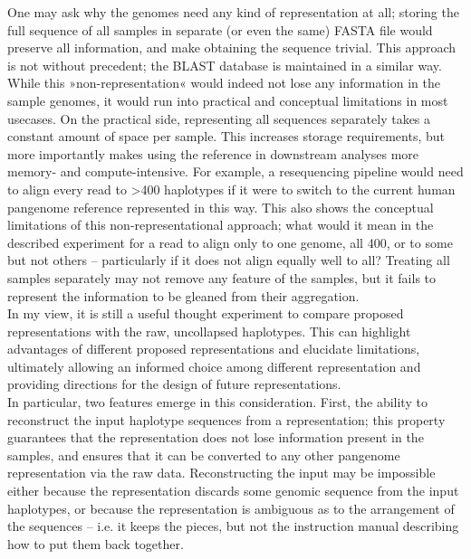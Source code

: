 One may ask why the genomes need any kind of representation at all; storing the full sequence of all samples in separate (or even the same) FASTA file would preserve all information, and make obtaining the sequence trivial.
This approach is not without precedent; the BLAST database is maintained in a similar way\cite{blastdoc}.
While this »non-representation« would indeed not lose any information in the sample genomes, it would run into practical and conceptual limitations in most usecases.
On the practical side, representing all sequences separately takes a constant amount of space per sample.
This increases storage requirements, but more importantly makes using the reference in downstream analyses more memory- and compute-intensive.
For example, a resequencing pipeline would need to align every read to >400 haplotypes if it were to switch to the current human pangenome reference represented in this way.
This also shows the conceptual limitations of this non-representational approach; what would it mean in the described experiment for a read to align only to one genome, all 400, or to some but not others -- particularly if it does not align equally well to all?
Treating all samples separately may not remove any feature of the samples, but it fails to represent the information to be gleaned from their aggregation.\\
In my view, it is still a useful thought experiment to compare proposed representations with the raw, uncollapsed haplotypes. %
This can highlight advantages of different proposed representations and elucidate limitations, ultimately allowing an informed choice among different representation and providing directions for the design of future representations.\\%
In particular, two features emerge in this consideration.
First, the ability to reconstruct the input haplotype sequences from a representation; this property guarantees that the representation does not lose information present in the samples, and ensures that it can be converted to any other pangenome representation via the raw data. %
Reconstructing the input may be impossible either because the representation discards some genomic sequence from the input haplotypes, or because the representation is ambiguous as to the arrangement of the sequences -- i.e. it keeps the pieces, but not the instruction manual describing how to put them back together.
